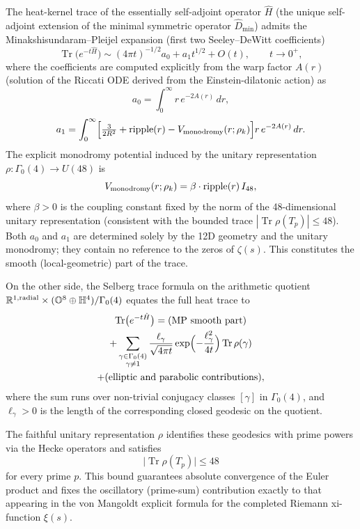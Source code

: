 \documentclass[11pt,a4paper]{article}
\begin{document}
The heat-kernel trace of the essentially self-adjoint operator \(\hat{H}\) (the unique self-adjoint extension of the minimal symmetric operator \(\hat{D}_{\min}\)) admits the Minakshisundaram--Pleijel expansion (first two Seeley--DeWitt coefficients)
\[
\operatorname{Tr}\bigl(e^{-t\hat{H}}\bigr) \sim (4\pi t)^{-1/2} a_0 + a_1 t^{1/2} + O(t), \qquad t\to 0^+,
\]
where the coefficients are computed explicitly from the warp factor \(A(r)\) (solution of the Riccati ODE derived from the Einstein-dilatonic action) as
\[
a_0 = \int_0^\infty r\,e^{-2A(r)}\,dr,
\]
\[
a_1 = \int_0^\infty \Bigl[\tfrac{3}{2R^2} + \mathrm{ripple}(r) - V_{\rm monodromy}(r;\rho_k)\Bigr] r\,e^{-2A(r)}\,dr.
\]
The explicit monodromy potential induced by the unitary representation \(\rho : \Gamma_0(4) \to U(48)\) is
\[
V_{\rm monodromy}(r;\rho_k) = \beta \cdot \mathrm{ripple}(r) \, I_{48},
\]
where \(\beta > 0\) is the coupling constant fixed by the norm of the 48-dimensional unitary representation (consistent with the bounded trace \(|\operatorname{Tr}\rho(T_p)| \le 48\)). Both \(a_0\) and \(a_1\) are determined solely by the 12D geometry and the unitary monodromy; they contain no reference to the zeros of \(\zeta(s)\). This constitutes the smooth (local-geometric) part of the trace.

On the other side, the Selberg trace formula on the arithmetic quotient \(\mathbb{R}^{1,\rm radial} \times (\mathbb{O}^8\oplus\mathbb{H}^4)/\Gamma_0(4)\) equates the full heat trace to
\begin{multline}
\operatorname{Tr}\bigl(e^{-t\hat{H}}\bigr) = \text{(MP smooth part)} \\
+ \sum_{\substack{\gamma \in \Gamma_0(4) \\ \gamma \neq 1}} \frac{\ell_\gamma}{\sqrt{4\pi t}} \exp\Bigl(-\frac{\ell_\gamma^2}{4t}\Bigr) \operatorname{Tr}\rho(\gamma) \\
+ \text{(elliptic and parabolic contributions)},
\end{multline}
where the sum runs over non-trivial conjugacy classes \([\gamma]\) in \(\Gamma_0(4)\), and \(\ell_\gamma > 0\) is the length of the corresponding closed geodesic on the quotient.

The faithful unitary representation \(\rho\) identifies these geodesics with prime powers via the Hecke operators and satisfies
\[
\bigl|\operatorname{Tr}\rho(T_p)\bigr| \le 48
\]
for every prime \(p\). This bound guarantees absolute convergence of the Euler product and fixes the oscillatory (prime-sum) contribution exactly to that appearing in the von Mangoldt explicit formula for the completed Riemann xi-function \(\xi(s)\).
\end{document}
